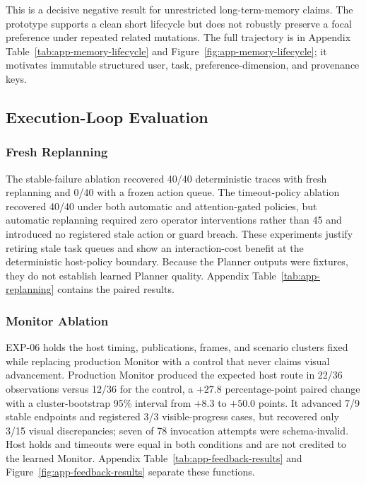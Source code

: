 \documentclass{article}
\begin{document}
This is a decisive negative result for unrestricted long-term-memory claims.
The prototype supports a clean short lifecycle but does not robustly preserve a
focal preference under repeated related mutations. The full trajectory is in
Appendix Table~\ref{tab:app-memory-lifecycle} and
Figure~\ref{fig:app-memory-lifecycle}; it motivates immutable structured user,
task, preference-dimension, and provenance keys.

\subsection{Execution-Loop Evaluation}
\label{subsec:evaluation-execution-loop}

\subsubsection{Fresh Replanning}

The stable-failure ablation recovered 40/40 deterministic traces with fresh
replanning and 0/40 with a frozen action queue. The timeout-policy ablation
recovered 40/40 under both automatic and attention-gated policies, but automatic
replanning required zero operator interventions rather than 45 and introduced
no registered stale action or guard breach. These experiments justify retiring
stale task queues and show an interaction-cost benefit at the deterministic
host-policy boundary. Because the Planner outputs were fixtures, they do not
establish learned Planner quality. Appendix Table~\ref{tab:app-replanning}
contains the paired results.

\subsubsection{Monitor Ablation}

EXP-06 holds the host timing, publications, frames, and scenario clusters fixed
while replacing production Monitor with a control that never claims visual
advancement. Production Monitor produced the expected host route in 22/36
observations versus 12/36 for the control, a $+27.8$ percentage-point paired
change with a cluster-bootstrap 95\% interval from $+8.3$ to $+50.0$
points. It advanced 7/9 stable endpoints and registered 3/3 visible-progress
cases, but recovered only 3/15 visual discrepancies; seven of 78 invocation
attempts were schema-invalid. Host holds and timeouts were equal in both
conditions and are not credited to the learned Monitor. Appendix
Table~\ref{tab:app-feedback-results} and
Figure~\ref{fig:app-feedback-results} separate these functions.
\end{document}
